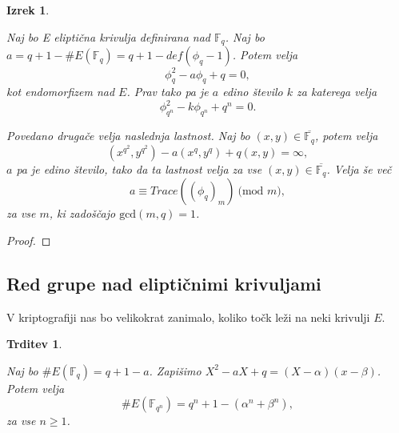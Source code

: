 \documentclass[12pt,a4paper,twoside]{article}
\theoremstyle{definition} %
\theoremstyle{plain} %
\newtheorem{izrek}[definicija]{Izrek}
\newtheorem{trditev}[definicija]{Trditev}
\numberwithin{equation}{section}  %
\newcommand{\F}{\mathbb F}
\newcommand{\E}[1]{E({#1})}
\newcommand{\MOD}[1]{\ \text{(mod }{#1}\text{)}}
\begin{document}
\begin{izrek}
\label{izrek:4.10}

Naj bo E eliptična krivulja definirana nad $\F_q$. Naj bo $a = q+1-\#\E{\F_q} = q+1-def(\phi_q-1)$. Potem velja
$$\phi^2_q-a\phi_q+q = 0,$$
kot endomorfizem nad $E$. Prav tako pa je $a$ edino število $k$ za katerega velja
$$\phi^2_{q^n}-k\phi_{q^n}+q^n = 0.$$

Povedano drugače velja naslednja lastnost. Naj bo $(x,y) \in  \overline{\F_q}$, potem velja
$$(x^{q^2},y^{q^2})-a(x^q,y^q)+q(x,y) = \infty,$$
$a$ pa je edino število, tako da ta lastnost velja za vse $(x,y) \in \overline{\F_q} $. Velja še več
$$a \equiv Trace((\phi_q)_m) \MOD{m},$$
za vse $m$, ki zadoščajo $\text{gcd}(m,q)=1$.

\end{izrek}

\begin{proof}

\end{proof}

\subsection{Red grupe nad eliptičnimi krivuljami}


V kriptografiji nas bo velikokrat zanimalo, koliko točk leži na neki krivulji $E$.




\begin{trditev}
\label{trd:red}

Naj bo $\# \E{\F_q} = q+1-a$. Zapišimo $X^2-aX+q = (X-\alpha)(x-\beta)$. Potem velja
$$\# \E{\F_{q^{n}}} = q^n+1-(\alpha^n+\beta^n),$$
za vse $n \geq 1$.

\end{trditev}
\end{document}

